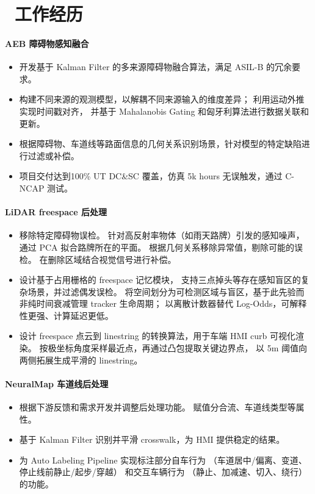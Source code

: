 \section{\faUsers\ 工作经历}


\paragraph{AEB 障碍物感知融合}
\begin{itemize}
      \item 开发基于 Kalman Filter 的多来源障碍物融合算法，满足 ASIL-B 的冗余要求。
      \item 构建不同来源的观测模型，以解耦不同来源输入的维度差异；
            利用运动外推实现时间戳对齐，
            并基于 Mahalanobis Gating 和匈牙利算法进行数据关联和更新。
      \item 根据障碍物、车道线等路面信息的几何关系识别场景，针对模型的特定缺陷进行过滤或补偿。
      \item 项目交付达到100\% UT DC\&SC 覆盖，仿真 5k hours 无误触发，通过 C-NCAP 测试。
\end{itemize}

\paragraph{LiDAR freespace 后处理}
\begin{itemize}
      \item 移除特定障碍物误检。
            针对高反射率物体（如雨天路牌）引发的感知噪声，
            通过 PCA 拟合路牌所在的平面。
            根据几何关系移除异常值，剔除可能的误检。
            在删除区域结合视觉信号进行补偿。
      \item 设计基于占用栅格的 freespace 记忆模块，
            支持三点掉头等存在感知盲区的复杂场景，并过滤偶发误检。
            将空间划分为可检测区域与盲区，基于此先验而非纯时间衰减管理 tracker 生命周期；
            以离散计数器替代 Log-Odds，可解释性更强、计算延迟更低。
      \item 设计 freespace 点云到 linestring 的转换算法，用于车端 HMI curb 可视化渲染。
            按极坐标角度采样最近点，再通过凸包提取关键边界点，
            以 5m 阈值向两侧拓展生成平滑的 linestring。
\end{itemize}

\paragraph{NeuralMap 车道线后处理}
\begin{itemize}
      \item 根据下游反馈和需求开发并调整后处理功能。
            赋值分合流、车道线类型等属性。
      \item 基于  Kalman Filter 识别并平滑 crosswalk，为 HMI 提供稳定的结果。
      \item 为 Auto Labeling Pipeline 实现标注部分自车行为
            （车道居中/偏离、变道、停止线前静止/起步/穿越）
            和交互车辆行为
            （静止、加减速、切入、绕行）
            的功能。
\end{itemize}

